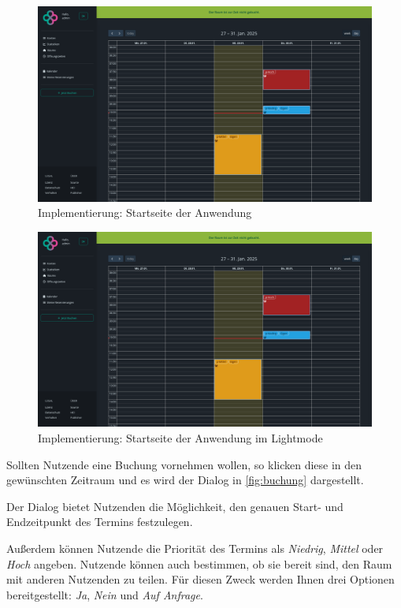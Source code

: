 \begin{figure}[ht]
    \centering
    \includegraphics[width=\textwidth]{figures/impl-views/calendar}
    \caption{Implementierung: Startseite der Anwendung}
    \label{fig:impl-startseite}
\end{figure}
\begin{figure}[ht]
    \centering
    \includegraphics[width=\textwidth]{figures/impl-views/calendar}
    \caption{Implementierung: Startseite der Anwendung im Lightmode} %
    \label{fig:impl-startseite_lightmode}
\end{figure}
\pagebreak

Sollten Nutzende eine Buchung vornehmen wollen, so klicken diese in den gewünschten Zeitraum
und es wird der Dialog in \ref{fig:buchung} dargestellt.

Der Dialog bietet Nutzenden die Möglichkeit, den genauen Start- und Endzeitpunkt des Termins festzulegen.

Außerdem können Nutzende die Priorität des Termins als \textit{Niedrig}, \textit{Mittel} oder \textit{Hoch} angeben.
Nutzende können auch bestimmen, ob sie bereit sind, den Raum mit anderen Nutzenden zu teilen.
Für diesen Zweck werden Ihnen drei Optionen bereitgestellt: \textit{Ja}, \textit{Nein} und \textit{Auf Anfrage}.

